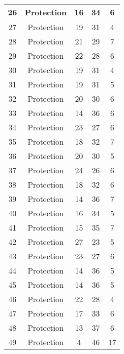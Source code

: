 \documentclass[results.tex]{subfiles}
\begin{document}
\begin{center}
\begin{tabular}{| c || c | c | c | c |}
    \hline
    26 & Protection & 16 & 34 & 6 \\ 
    \hline
    27 & Protection & 19 & 31 & 4 \\ 
    \hline
    28 & Protection & 21 & 29 & 7 \\ 
    \hline
    29 & Protection & 22 & 28 & 6 \\ 
    \hline
    30 & Protection & 19 & 31 & 4 \\ 
    \hline
    31 & Protection & 19 & 31 & 5 \\ 
    \hline
    32 & Protection & 20 & 30 & 6 \\ 
    \hline
    33 & Protection & 14 & 36 & 6 \\ 
    \hline
    34 & Protection & 23 & 27 & 6 \\ 
    \hline
    35 & Protection & 18 & 32 & 7 \\ 
    \hline
    36 & Protection & 20 & 30 & 5 \\ 
    \hline
    37 & Protection & 24 & 26 & 6 \\ 
    \hline
    38 & Protection & 18 & 32 & 6 \\ 
    \hline
    39 & Protection & 14 & 36 & 7 \\ 
    \hline
    40 & Protection & 16 & 34 & 5 \\ 
    \hline
    41 & Protection & 15 & 35 & 7 \\ 
    \hline
    42 & Protection & 27 & 23 & 5 \\ 
    \hline
    43 & Protection & 23 & 27 & 6 \\ 
    \hline
    44 & Protection & 14 & 36 & 5 \\ 
    \hline
    45 & Protection & 14 & 36 & 5 \\ 
    \hline
    46 & Protection & 22 & 28 & 4 \\ 
    \hline
    47 & Protection & 17 & 33 & 6 \\ 
    \hline
    48 & Protection & 13 & 37 & 6 \\ 
    \hline
    49 & Protection & 4 & 46 & 17 \\ 
    \hline   \end{tabular}
\end{center}
\end{document}
